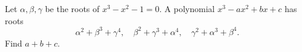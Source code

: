 Let $\alpha,\beta,\gamma$ be the roots of $x^3-x^2-1=0$. A polynomial $x^3-ax^2+bx+c$ has roots
\[
\alpha^2+\beta^3+\gamma^4,\quad
\beta^2+\gamma^3+\alpha^4,\quad
\gamma^2+\alpha^3+\beta^4.
\]
Find $a+b+c$.
